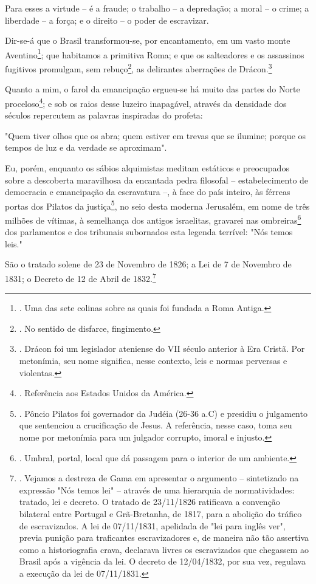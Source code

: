 Para esses a virtude -- é a fraude; o trabalho -- a depredação; a moral
-- o crime; a liberdade -- a força; e o direito -- o poder de
escravizar.

Dir-se-á que o Brasil transformou-se, por encantamento, em um vasto
monte Aventino\footnote{. Uma das sete colinas sobre as quais foi
  fundada a Roma Antiga.}; que habitamos a primitiva Roma; e que os
salteadores e os assassinos fugitivos promulgam, sem rebuço\footnote{.
  No sentido de disfarce, fingimento.}, as delirantes aberrações de
Drácon.\footnote{. Drácon foi um legislador ateniense do VII século
  anterior à Era Cristã. Por metonímia, seu nome significa, nesse
  contexto, leis e normas perversas e violentas.}

Quanto a mim, o farol da emancipação ergueu-se há muito das partes do
Norte proceloso\footnote{. Referência aos Estados Unidos da América.}; e
sob os raios desse luzeiro inapagável, através da densidade dos séculos
repercutem as palavras inspiradas do profeta:

"Quem tiver olhos que os abra; quem estiver em trevas que se ilumine;
porque os tempos de luz e da verdade se aproximam".

Eu, porém, enquanto os sábios alquimistas meditam estáticos e
preocupados sobre a descoberta maravilhosa da encantada pedra filosofal
-- estabelecimento de democracia e emancipação da escravatura --, à face
do país inteiro, às férreas portas dos Pilatos da justiça\footnote{.
  Pôncio Pilatos foi governador da Judéia (26-36 a.C) e presidiu o
  julgamento que sentenciou a crucificação de Jesus. A referência, nesse
  caso, toma seu nome por metonímia para um julgador corrupto, imoral e
  injusto.}, no seio desta moderna Jerusalém, em nome de três milhões de
vítimas, à semelhança dos antigos israelitas, gravarei nas
ombreiras\footnote{. Umbral, portal, local que dá passagem para o
  interior de um ambiente.} dos parlamentos e dos tribunais subornados
esta legenda terrível: "Nós temos leis."

São o tratado solene de 23 de Novembro de 1826; a Lei de 7 de Novembro
de 1831; o Decreto de 12 de Abril de 1832.\footnote{. Vejamos a destreza
  de Gama em apresentar o argumento -- sintetizado na expressão "Nós
  temos lei" -- através de uma hierarquia de normatividades: tratado,
  lei e decreto. O tratado de 23/11/1826 ratificava a convenção
  bilateral entre Portugal e Grã-Bretanha, de 1817, para a abolição do
  tráfico de escravizados. A lei de 07/11/1831, apelidada de "lei para
  inglês ver", previa punição para traficantes escravizadores e, de
  maneira não tão assertiva como a historiografia crava, declarava
  livres os escravizados que chegassem ao Brasil após a vigência da lei.
  O decreto de 12/04/1832, por sua vez, regulava a execução da lei de
  07/11/1831.}


